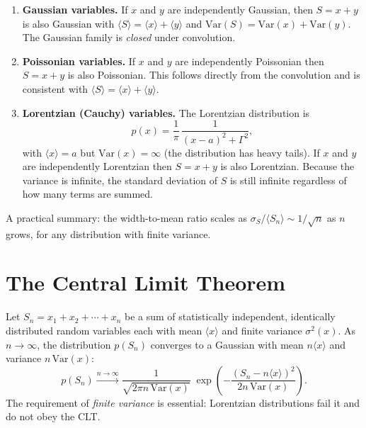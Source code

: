 \begin{enumerate}
    \item \textbf{Gaussian variables.} If $x$ and $y$ are independently Gaussian, then $S = x + y$ is also Gaussian with $\langle S\rangle = \langle x\rangle + \langle y\rangle$ and $\mathrm{Var}(S) = \mathrm{Var}(x) + \mathrm{Var}(y)$. The Gaussian family is \emph{closed} under convolution.

    \item \textbf{Poissonian variables.} If $x$ and $y$ are independently Poissonian then $S = x + y$ is also Poissonian. This follows directly from the convolution and is consistent with $\langle S\rangle = \langle x\rangle + \langle y\rangle$.

    \item \textbf{Lorentzian (Cauchy) variables.} The Lorentzian distribution is
    \begin{equation}
        p(x) = \frac{1}{\pi}\,\frac{1}{(x-a)^2 + \Gamma^2},
    \end{equation}
    with $\langle x\rangle = a$ but $\mathrm{Var}(x) = \infty$ (the distribution has heavy tails). If $x$ and $y$ are independently Lorentzian then $S = x + y$ is also Lorentzian. Because the variance is infinite, the standard deviation of $S$ is still infinite regardless of how many terms are summed.
\end{enumerate}

A practical summary: the width-to-mean ratio scales as $\sigma_S / \langle S_n\rangle \sim 1/\sqrt{n}$ as $n$ grows, for any distribution with finite variance.

\section{The Central Limit Theorem}

\begin{theorem}
Let $S_n = x_1 + x_2 + \cdots + x_n$ be a sum of statistically independent, identically distributed random variables each with mean $\langle x\rangle$ and finite variance $\sigma^2(x)$. As $n \to \infty$, the distribution $p(S_n)$ converges to a Gaussian with mean $n\langle x\rangle$ and variance $n\,\mathrm{Var}(x)$:
\begin{equation}
    p(S_n) \xrightarrow{n\to\infty} \frac{1}{\sqrt{2\pi n\,\mathrm{Var}(x)}}\;\exp\!\left(-\frac{(S_n - n\langle x\rangle)^2}{2n\,\mathrm{Var}(x)}\right).
\end{equation}
The requirement of \emph{finite variance} is essential: Lorentzian distributions fail it and do not obey the CLT.
\end{theorem}

